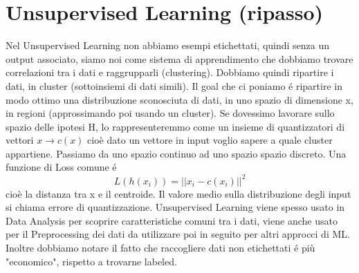 \documentclass{article}
\begin{document}
\section{Unsupervised Learning (ripasso)}
Nel Unsupervised Learning non abbiamo esempi etichettati, quindi senza un output associato, siamo noi come sistema di apprendimento che dobbiamo trovare correlazioni tra i dati e raggrupparli (clustering). Dobbiamo quindi ripartire i dati, in cluster (sottoinsiemi di dati simili). Il goal che ci poniamo é ripartire in modo ottimo una distribuzione sconosciuta di dati, in uno spazio di dimensione x, in regioni (approssimando poi usando un cluster). \newline 
Se dovessimo lavorare sullo spazio delle ipotesi H, lo rappresenteremmo come un insieme di quantizzatori di vettori $x\rightarrow c(x)$ cioè dato un vettore in input voglio sapere a quale cluster appartiene. Passiamo da uno spazio continuo ad uno spazio spazio discreto. \newline 
Una funzione di Loss comune é \[L(h(x_i))=||x_i-c(x_i)||^2\] cioè la distanza tra x e il centroide. Il valore medio sulla distribuzione degli input si chiama errore di quantizzazione. \newline
Unsupervised Learning viene spesso usato in Data Analysis per scoprire caratteristiche comuni tra i dati, viene anche usato per il Preprocessing dei dati da utilizzare poi in seguito per altri approcci di ML. Inoltre dobbiamo notare il fatto che raccogliere dati non etichettati é più "economico", rispetto a trovarne labeled.
\end{document}
